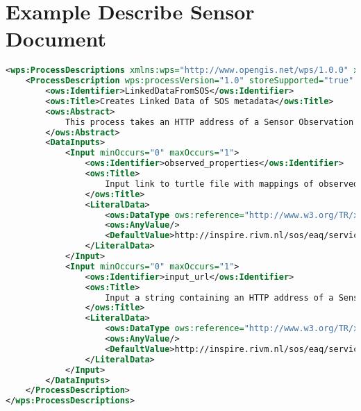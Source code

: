\section{Example Describe Sensor Document}
\label{app:wpsDescribe}
\begin{lstlisting}[language=xml]
	<wps:ProcessDescriptions xmlns:wps="http://www.opengis.net/wps/1.0.0" xmlns:ows="http://www.opengis.net/ows/1.1" xmlns:xlink="http://www.w3.org/1999/xlink" xmlns:xsi="http://www.w3.org/2001/XMLSchema-instance" xsi:schemaLocation="http://www.opengis.net/wps/1.0.0 http://schemas.opengis.net/wps/1.0.0/wpsDescribeProcess_response.xsd" service="WPS" version="1.0.0" xml:lang="en-CA">
	<ProcessDescription wps:processVersion="1.0" storeSupported="true" statusSupported="false">
		<ows:Identifier>LinkedDataFromSOS</ows:Identifier>
		<ows:Title>Creates Linked Data of SOS metadata</ows:Title>
		<ows:Abstract>
			This process takes an HTTP address of a Sensor Observation Service (SOS) as input and converts the metadata to linked data.
		</ows:Abstract>
		<DataInputs>
			<Input minOccurs="0" maxOccurs="1">
				<ows:Identifier>observed_properties</ows:Identifier>
				<ows:Title>
					Input link to turtle file with mappings of observed property identifiers to DBPedia URIs
				</ows:Title>
				<LiteralData>
					<ows:DataType ows:reference="http://www.w3.org/TR/xmlschema-2/#string">string</ows:DataType>
					<ows:AnyValue/>
					<DefaultValue>http://inspire.rivm.nl/sos/eaq/service?</DefaultValue>
				</LiteralData>
			</Input>
			<Input minOccurs="0" maxOccurs="1">
				<ows:Identifier>input_url</ows:Identifier>
				<ows:Title>
					Input a string containing an HTTP address of a Sensor Observation Service (SOS). For example: 'http://someaddress.com/sos?'
				</ows:Title>
				<LiteralData>
					<ows:DataType ows:reference="http://www.w3.org/TR/xmlschema-2/#string">string</ows:DataType>
					<ows:AnyValue/>
					<DefaultValue>http://inspire.rivm.nl/sos/eaq/service?</DefaultValue>
				</LiteralData>
			</Input>
		</DataInputs>
	</ProcessDescription>
</wps:ProcessDescriptions>
\end{lstlisting}

\clearpage

